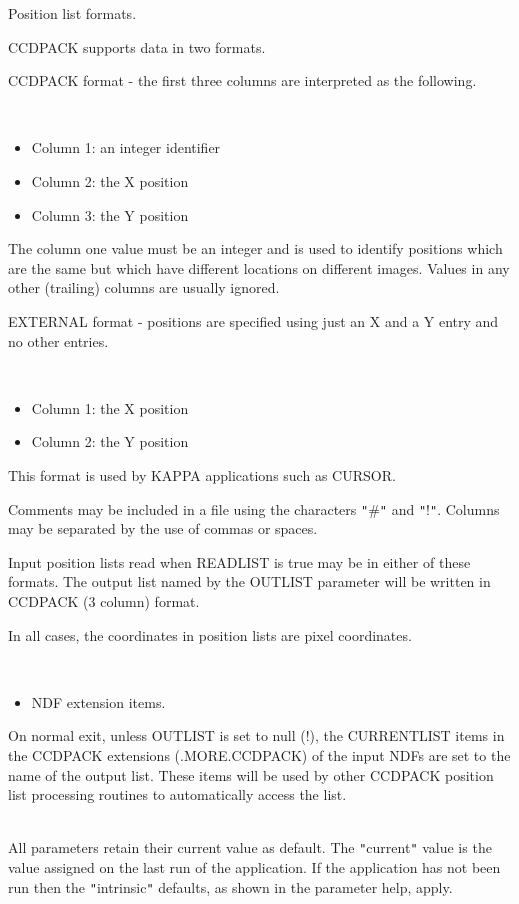 \documentclass[twoside,11pt]{article}
\newcommand{\xref}[3]{#1}
\renewcommand{\_}{\texttt{\symbol{95}}}
\newcommand{\sstdiytopic}[2]{\item[#1:] \mbox{} \\[1.3ex] #2}
\newcommand{\sstitemlist}[1]{
  \mbox{} \\
  \vspace{-3.5ex}
  \begin{itemize}
     #1
  \end{itemize}
}
\newcommand{\sstitem}{\item}
\newcommand{\sstdiytopic}[2]{\item[{#1}] #2 }
\newcommand{\sstitemlist}[1]{
      \begin{itemize}
         #1
      \end{itemize}
      \\
   }
\newcommand{\sstitem}{\item}
\begin{document}
{{{         \sstitem
         Position list formats.

      }
        CCDPACK supports data in two formats.

        CCDPACK format - the first three columns are interpreted as the
        following.

      \sstitemlist{

         \sstitem
              Column 1: an integer identifier

         \sstitem
              Column 2: the X position

         \sstitem
              Column 3: the Y position

      }
        The column one value must be an integer and is used to identify
        positions which are the same but which have different locations
        on different images. Values in any other (trailing) columns are
        usually ignored.

        EXTERNAL format - positions are specified using just an X and
        a Y entry and no other entries.

      \sstitemlist{

         \sstitem
              Column 1: the X position

         \sstitem
              Column 2: the Y position

      }
        This format is used by KAPPA applications such as \xref{CURSOR}{sun95}{CURSOR}.

        Comments may be included in a file using the characters {\tt "}\#{\tt "} and
        {\tt "}!{\tt "}. Columns may be separated by the use of commas or spaces.

        Input position lists read when READLIST is true may be in either
        of these formats.  The output list named by the OUTLIST
        parameter will be written in CCDPACK (3 column) format.

        In all cases, the coordinates in position lists are pixel
        coordinates.

      \sstitemlist{

         \sstitem
         NDF extension items.

      }
        On normal exit, unless OUTLIST is set to null (!), the
        CURRENT\_LIST items in the CCDPACK extensions (.MORE.CCDPACK) of
        the input NDFs are set to the name of the output list. These
        items will be used by other CCDPACK position list processing
        routines to automatically access the list.
   }
   \sstdiytopic{
      Behaviour of parameters
   }{
      All parameters retain their current value as default. The
      {\tt "}current{\tt "} value is the value assigned on the last run of the
      application. If the application has not been run then the
      {\tt "}intrinsic{\tt "} defaults, as shown in the parameter help, apply.

}}
\end{document}
